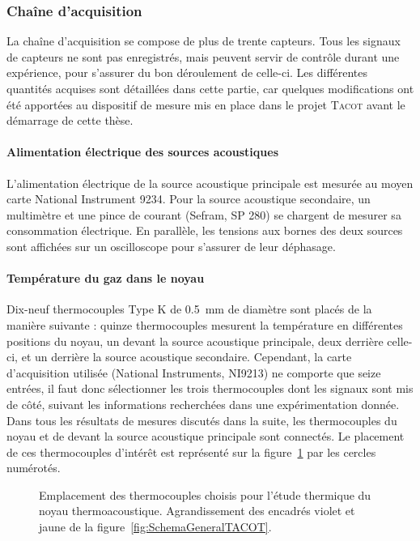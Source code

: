 \subsubsection{Chaîne d'acquisition}
La chaîne d'acquisition se compose de plus de trente capteurs. Tous les signaux de capteurs ne sont pas enregistrés, mais peuvent servir de contrôle durant une expérience, pour s'assurer du bon déroulement de celle-ci. Les différentes quantités acquises sont détaillées dans cette partie, car quelques modifications ont été apportées au dispositif de mesure mis en place dans le projet \textsc{Tacot} avant le démarrage de cette thèse.

\paragraph{Alimentation électrique des sources acoustiques} L'alimentation électrique de la source acoustique principale est mesurée au moyen carte National Instrument 9234. Pour la source acoustique secondaire, un multimètre  et une pince de courant (Sefram, SP 280) se chargent de mesurer sa consommation électrique. En parallèle, les tensions aux bornes des deux sources sont affichées sur un oscilloscope pour s'assurer de leur déphasage.

\paragraph{Température du gaz dans le noyau} \label{chap:PresTC} Dix-neuf thermocouples Type K de \qty{.5}{\milli\meter} de diamètre sont placés de la manière suivante : quinze thermocouples mesurent la température en différentes positions du noyau, un devant la source acoustique principale, deux derrière celle-ci, et un derrière la source acoustique secondaire. Cependant, la carte d'acquisition utilisée (National Instruments, NI9213) ne comporte que seize entrées, il faut donc sélectionner les trois thermocouples dont les signaux sont mis de côté, suivant les informations recherchées dans une expérimentation donnée. Dans tous les résultats de mesures discutés dans la suite, les thermocouples du noyau et de devant la source acoustique principale sont connectés. Le placement de ces thermocouples d'intérêt est représenté sur la figure~\ref{fig:TCdansNoyau} par les cercles numérotés.

\begin{figure}[!ht]
    \centering
    
    \caption{Emplacement des thermocouples choisis pour l'étude thermique du noyau thermoacoustique. Agrandissement des encadrés violet et jaune de la figure~\ref{fig:SchemaGeneralTACOT}.}
    \label{fig:TCdansNoyau}
\end{figure}

